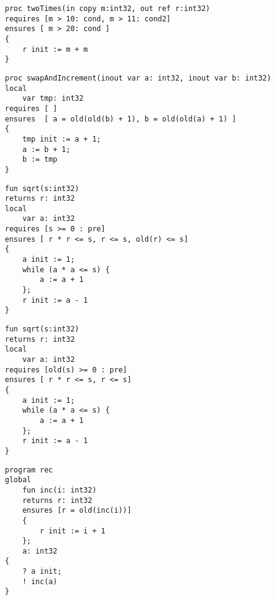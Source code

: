 \begin{lstlisting}[caption=Gleiche Labels in Conditions derselben Routine.]
proc twoTimes(in copy m:int32, out ref r:int32)
requires [m > 10: cond, m > 11: cond2]
ensures [ m > 20: cond ]
{
    r init := m + m
}
\end{lstlisting}

\begin{lstlisting}[caption=Auf die Funktion old darf im preexecution State nicht zugegriffen werden.]
proc swapAndIncrement(inout var a: int32, inout var b: int32)
local 
    var tmp: int32
requires [ ]
ensures  [ a = old(old(b) + 1), b = old(old(a) + 1) ]
{
    tmp init := a + 1;
    a := b + 1;
    b := tmp
}

\end{lstlisting}
                                                                         
\begin{lstlisting}[caption=Zugriff auf uninitialisierter Wert in preexecution State mittels old]
fun sqrt(s:int32)
returns r: int32
local 
    var a: int32
requires [s >= 0 : pre]
ensures [ r * r <= s, r <= s, old(r) <= s]
{
    a init := 1;
    while (a * a <= s) {
        a := a + 1
    };      
    r init := a - 1
}
\end{lstlisting}


\begin{lstlisting}[caption=Zugriff auf Funktion old in precondition]
fun sqrt(s:int32)
returns r: int32
local 
    var a: int32
requires [old(s) >= 0 : pre]
ensures [ r * r <= s, r <= s]
{
    a init := 1;
    while (a * a <= s) {
        a := a + 1
    };      
    r init := a - 1
}
\end{lstlisting}

\begin{lstlisting}[caption=Rekursiver Aufruf in condition.]
program rec
global
    fun inc(i: int32)
    returns r: int32
    ensures [r = old(inc(i))]
    {
        r init := i + 1
    };
    a: int32
{
    ? a init;
    ! inc(a)    
}
\end{lstlisting}

